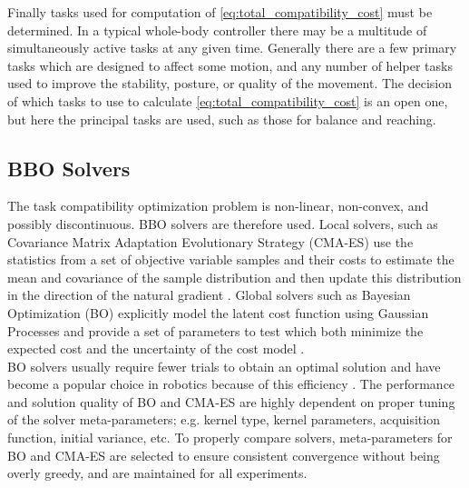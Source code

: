 \documentclass[12pt,a4paper,twoside]{article}
\begin{document}
        Finally  tasks  used for computation of \eqref{eq:total_compatibility_cost} must be determined. In a typical whole-body controller there may be a multitude of simultaneously active tasks at any given time. Generally there are a few primary tasks which are designed to affect some motion, and any number of helper tasks used to improve the stability, posture, or quality of the movement. The decision of which tasks to use to calculate \eqref{eq:total_compatibility_cost} is an open one, but here the principal tasks are used, such as those for balance and reaching.


\subsection{BBO Solvers}
\label{sec:bbo_solvers}
The task compatibility optimization problem is non-linear, non-convex, and possibly discontinuous. BBO solvers are therefore used. Local solvers, such as Covariance Matrix Adaptation Evolutionary Strategy (CMA-ES) use the statistics from a set of objective variable samples and their costs to estimate the mean and covariance of the sample distribution and then update this distribution in the direction of the natural gradient \cite{Ollivier2011}. Global solvers such as Bayesian Optimization (BO) explicitly model the latent cost function using Gaussian Processes and provide a set of parameters to test which both minimize the expected cost and the uncertainty of the cost model \cite{Rasmussen2006}.\\
%
%
%
%
BO solvers usually require fewer trials to obtain an optimal solution and have become a popular choice in robotics because of this efficiency \cite{Calandra2014, Antonova2016, Englert2016}.
The performance and solution quality of BO and CMA-ES are highly dependent on proper tuning of the solver meta-parameters; e.g. kernel type, kernel parameters, acquisition function, initial variance, etc. To properly compare solvers, meta-parameters for BO and CMA-ES are selected to ensure consistent convergence without being overly greedy, and are maintained for all experiments.
%
\end{document}
